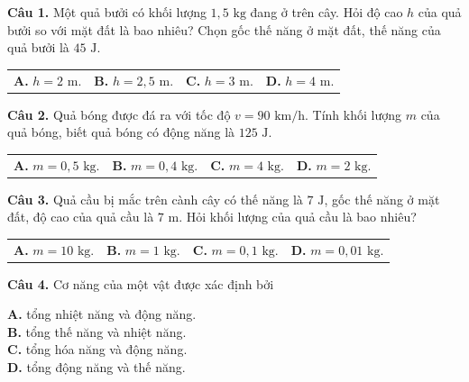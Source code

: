 \documentclass{article}
\begin{document}

\fontsize{25}{33}\selectfont
\textbf{Câu 1.} Một quả bưởi có khối lượng $1,5\text{ kg}$ đang ở trên cây. Hỏi độ cao $h$ của quả bưởi so với mặt đất là bao nhiêu? Chọn gốc thế năng ở mặt đất, thế năng của quả bưởi là $45\text{ J}$.
\vspace{6pt}

\begin{tabularx}{\linewidth}{@{}X X X X@{}}
\textbf{A.} $h = 2\text{ m}$. & \textbf{B.} $h = 2,5\text{ m}$. & \textbf{C.} $h = 3\text{ m}$. & \textbf{D.} $h = 4\text{ m}$.
\end{tabularx}

\vspace*{\fill}

\textbf{Câu 2.} Quả bóng được đá ra với tốc độ $v = 90\text{ km/h}$. Tính khối lượng $m$ của quả bóng, biết quả bóng có động năng là $125\text{ J}$.
\vspace{6pt}

\begin{tabularx}{\linewidth}{@{}X X X X@{}}
\textbf{A.} $m = 0,5\text{ kg}$. & \textbf{B.} $m = 0,4\text{ kg}$. & \textbf{C.} $m = 4\text{ kg}$. & \textbf{D.} $m = 2\text{ kg}$.
\end{tabularx}
\vspace*{\fill}
\newpage

\fontsize{25}{33}\selectfont
\textbf{Câu 3.} Quả cầu bị mắc trên cành cây có thế năng là $7\text{ J}$, gốc thế năng ở mặt đất, độ cao của quả cầu là $7\text{ m}$. Hỏi khối lượng của quả cầu là bao nhiêu?
\vspace{6pt}

\begin{tabularx}{\linewidth}{@{}X X X X@{}}
\textbf{A.} $m = 10\text{ kg}$. & \textbf{B.} $m = 1\text{ kg}$. & \textbf{C.} $m = 0,1\text{ kg}$. & \textbf{D.} $m = 0,01\text{ kg}$.
\end{tabularx}

\vspace*{\fill}

\textbf{Câu 4.} Cơ năng của một vật được xác định bởi
\vspace{6pt}

\textbf{A.} tổng nhiệt năng và động năng.\\
\textbf{B.} tổng thế năng và nhiệt năng.\\
\textbf{C.} tổng hóa năng và động năng.\\
\textbf{D.} tổng động năng và thế năng.
\vspace*{\fill}
\newpage
\end{document}

